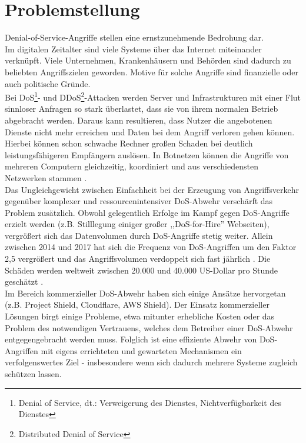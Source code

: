 \documentclass[../review_1.tex]{subfiles}
\begin{document}
\chapter{Problemstellung}\thispagestyle{fancy}
\vspace{-0.5cm}
Denial-of-Service-Angriffe stellen eine ernstzunehmende Bedrohung dar.\\
Im digitalen Zeitalter sind viele Systeme über das Internet miteinander verknüpft. Viele Unternehmen, Krankenhäusern und Behörden sind dadurch zu beliebten Angriffszielen geworden\cite{infopoint_security_cyber_angriffe}. Motive für solche Angriffe sind finanzielle oder auch politische Gründe.\\
Bei DoS\footnote{Denial of Service, dt.: Verweigerung des Dienstes, Nichtverfügbarkeit des Dienstes}- und DDoS\footnote{Distributed Denial of Service}-Attacken werden Server und Infrastrukturen mit einer Flut sinnloser Anfragen so stark überlastet, dass sie von ihrem normalen Betrieb abgebracht werden. Daraus kann resultieren, dass Nutzer die angebotenen Dienste nicht mehr erreichen und Daten bei dem Angriff verloren gehen können.\\
Hierbei können schon schwache Rechner großen Schaden bei deutlich leistungsfähigeren Empfängern auslösen. In Botnetzen können die Angriffe von mehreren Computern gleichzeitig, koordiniert und aus verschiedensten Netzwerken stammen \cite{tecchannel_gefahr_botnet}.\\
Das Ungleichgewicht zwischen Einfachheit bei der Erzeugung von Angriffsverkehr gegenüber komplexer und ressourcenintensiver DoS-Abwehr verschärft das Problem zusätzlich. Obwohl gelegentlich Erfolge im Kampf gegen DoS-Angriffe erzielt werden (z.B. Stilllegung einiger großer ,,DoS-for-Hire'' Webseiten), vergrößert sich das Datenvolumen durch DoS-Angriffe stetig weiter. Allein zwischen 2014 und 2017 hat sich die Frequenz von DoS-Angriffen um den Faktor 2,5 vergrößert und das Angriffsvolumen verdoppelt sich fast jährlich \cite{neustar_ddos_report}. Die Schäden werden weltweit zwischen 20.000 und 40.000 US-Dollar pro Stunde geschätzt \cite{datacenterknowledge_study}.\\
Im Bereich kommerzieller DoS-Abwehr haben sich einige Ansätze hervorgetan (z.B. Project Shield\cite{projectshield}, Cloudflare\cite{cloudflare}, AWS Shield\cite{aws_shield}). Der Einsatz kommerzieller Lösungen birgt einige Probleme, etwa mitunter erhebliche Kosten oder das Problem des notwendigen Vertrauens, welches dem Betreiber einer DoS-Abwehr entgegengebracht werden muss. Folglich ist eine effiziente Abwehr von DoS-Angriffen mit eigens errichteten und gewarteten Mechanismen ein verfolgenswertes Ziel - insbesondere wenn sich dadurch mehrere Systeme zugleich schützen lassen.\\
\end{document}
